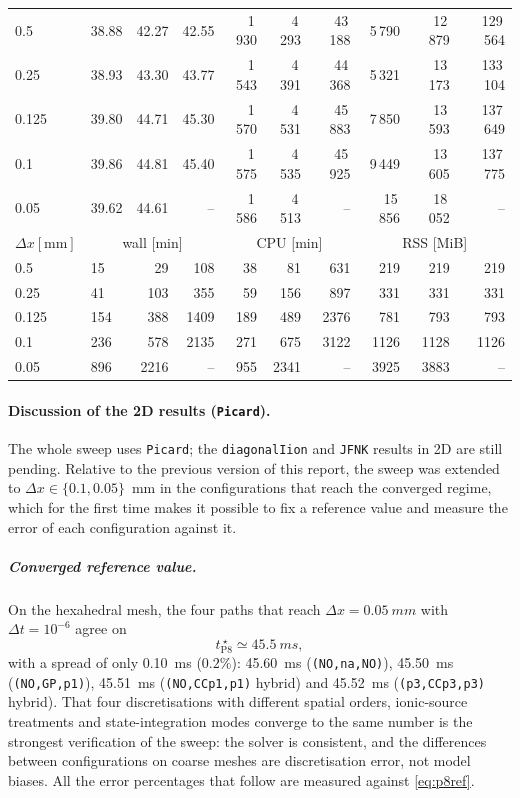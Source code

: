\documentclass[11pt,a4paper]{article}
\newcommand{\code}[1]{\texttt{\small #1}}
\begin{document}
\begin{center}
\begin{longtable}{l|lrr|rrr|rrr}
0.5 & 38.88 & 42.27 & 42.55 & 1\,930 & 4\,293 & 43\,188 & 5\,790 & 12\,879 & 129\,564\\
0.25 & 38.93 & 43.30 & 43.77 & 1\,543 & 4\,391 & 44\,368 & 5\,321 & 13\,173 & 133\,104\\
0.125 & 39.80 & 44.71 & 45.30 & 1\,570 & 4\,531 & 45\,883 & 7\,850 & 13\,593 & 137\,649\\
0.1 & 39.86 & 44.81 & 45.40 & 1\,575 & 4\,535 & 45\,925 & 9\,449 & 13\,605 & 137\,775\\
0.05 & 39.62 & 44.61 & -- & 1\,586 & 4\,513 & -- & 15\,856 & 18\,052 & --\\
\hline
$ \Delta x [\text{mm}] $ & \multicolumn{3}{c|}{wall [min]} & \multicolumn{3}{c|}{CPU [min]} & \multicolumn{3}{c|}{RSS [MiB]}\\
0.5 & 15 & 29 & 108 & 38 & 81 & 631 & 219 & 219 & 219\\
0.25 & 41 & 103 & 355 & 59 & 156 & 897 & 331 & 331 & 331\\
0.125 & 154 & 388 & 1409 & 189 & 489 & 2376 & 781 & 793 & 793\\
0.1 & 236 & 578 & 2135 & 271 & 675 & 3122 & 1126 & 1128 & 1126\\
0.05 & 896 & 2216 & -- & 955 & 2341 & -- & 3925 & 3883 & --\\
\hline
\bottomrule\end{longtable}\end{center}
\paragraph{Discussion of the 2D results (\code{Picard}).}
The whole sweep uses \code{Picard}; the \code{diagonalIion} and \code{JFNK} results
in 2D are still pending. Relative to the previous version of this report, the sweep was
extended to $\Delta x\in\{0.1,0.05\}$~mm in the configurations that reach the converged
regime, which for the first time makes it possible to fix a reference value and measure the
error of each configuration against it.

\subparagraph{Converged reference value.}
On the hexahedral mesh, the four paths that reach $\Delta x=\SI{0.05}{mm}$ with
$\Delta t=10^{-6}$ agree on
\begin{equation}
  t_{\mathrm{P8}}^{\ \star} \simeq \SI{45.5}{ms},
  \label{eq:p8ref}
\end{equation}
with a spread of only \SI{0.10}{ms} ($0.2\%$): \SI{45.60}{ms}
(\code{(NO,na,NO)}), \SI{45.50}{ms} (\code{(NO,GP,p1)}), \SI{45.51}{ms}
(\code{(NO,CCp1,p1)} hybrid) and \SI{45.52}{ms} (\code{(p3,CCp3,p3)} hybrid). That
four discretisations with different spatial orders, ionic-source treatments and
state-integration modes converge to the same number is the strongest verification
of the sweep: the solver is consistent, and the differences between
configurations on coarse meshes are discretisation error, not model biases.
All the error percentages that follow are measured against \eqref{eq:p8ref}.
\end{document}
